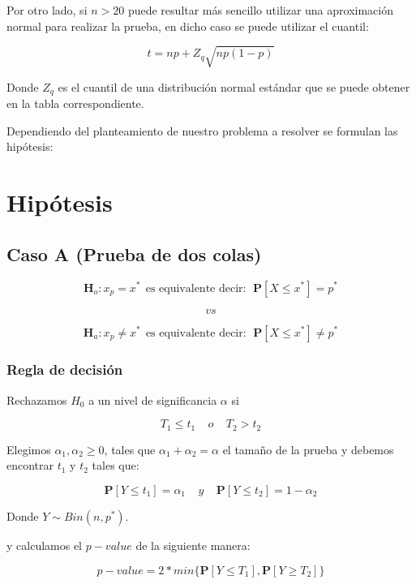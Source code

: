 \documentclass[
  a4paper,
  oneside,
  openany]{book}
\begin{document}
Por otro lado, si \(n>20\) puede resultar más sencillo utilizar una aproximación normal para realizar la prueba, en dicho caso se puede utilizar el cuantil:

\[
t=np+Z_{q}\sqrt{np(1-p)}
\]

Donde \(Z_{q}\) es el cuantil de una distribución normal estándar que se puede obtener en la tabla correspondiente.

Dependiendo del planteamiento de nuestro problema a resolver se formulan las hipótesis:

\hypertarget{hipuxf3tesis-1}{%
\section{Hipótesis}\label{hipuxf3tesis-1}}

\hypertarget{caso-a-prueba-de-dos-colas-1}{%
\subsection*{Caso A (Prueba de dos colas)}\label{caso-a-prueba-de-dos-colas-1}}


\[\textbf{H}_{o}: x_{p} = x^* \ \ \mbox{es equivalente  decir}: \ \ \mathbf{P}[X \leq x^*]= p^*\]

\[vs\]

\[\textbf{H}_a: x_{p} \neq x^* \ \ \mbox{es equivalente  decir}: \ \ \mathbf{P}[X \leq x^*]\neq p^*\]

\hypertarget{regla-de-decisiuxf3n-3}{%
\subsubsection*{Regla de decisión}\label{regla-de-decisiuxf3n-3}}


Rechazamos \(H_0\) a un nivel de significancia \(\alpha\) si

\[T_{1}\leq t_{1} \ \ \ \ \  o   \ \ \ \ \ T_{2}>t_{2}\]

Elegimos \(\alpha_{1},\alpha_{2}\geq 0\), tales que \(\alpha_{1}+\alpha_{2}=\alpha\) el tamaño de la prueba y debemos encontrar \(t_{1}\) y \(t_{2}\) tales que:

\[\mathbf{P}[Y \leq t_{1}]=\alpha_{1} \ \ \ \ \  y  \ \ \ \ \ \mathbf{P}[Y \leq t_{2}]=1-\alpha_{2}\]

Donde \(Y \sim Bin (n,p^*)\).

y calculamos el \(p-value\) de la siguiente manera:

\[p-value=2*min \{ \mathbf{P}[Y\leq T_{1}],\mathbf{P}[Y \geq T_{2}] \}\]
\end{document}
